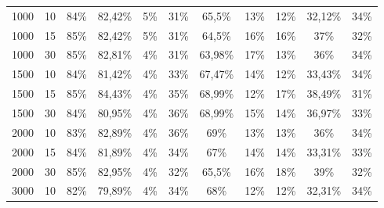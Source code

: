 \begin{table}[ht]
\begin{tabular}{cc|ccc|ccc|ccc}
        {1000}   & {10}     & {84\%}                              & {82,42\%}                           & {5\%}                                    & {31\%}        & {65,5\%}    & {13\%}      & {12\%}        & {32,12\%}   & {34\%}      \\
        {1000}   & {15}     & {85\%}                              & {82,42\%}                           & {5\%}                                    & {31\%}        & {64,5\%}    & {16\%}      & {16\%}        & {37\%}      & {32\%}      \\
        {1000}   & {30}     & {85\%}                              & {82,81\%}                           & {4\%}                                    & {31\%}        & {63,98\%}   & {17\%}      & {13\%}        & {36\%}      & {34\%}      \\
        {1500}   & {10}     & {84\%}                              & {81,42\%}                           & {4\%}                                    & {33\%}        & {67,47\%}   & {14\%}      & {12\%}        & {33,43\%}   & {34\%}      \\
        {1500}   & {15}     & {85\%}                              & {84,43\%}                           & {4\%}                                    & {35\%}        & {68,99\%}   & {12\%}      & {17\%}        & {38,49\%}   & {31\%}      \\
        {1500}   & {30}     & {84\%}                              & {80,95\%}                           & {4\%}                                    & {36\%}        & {68,99\%}   & {15\%}      & {14\%}        & {36,97\%}   & {33\%}      \\
        {2000}   & {10}     & {83\%}                              & {82,89\%}                           & {4\%}                                    & {36\%}        & {69\%}      & {13\%}      & {13\%}        & {36\%}      & {34\%}      \\
        {2000}   & {15}     & {84\%}                              & {81,89\%}                           & {4\%}                                    & {34\%}        & {67\%}      & {14\%}      & {14\%}        & {33,31\%}   & {33\%}      \\
        {2000}   & {30}     & {85\%}                              & {82,95\%}                           & {4\%}                                    & {32\%}        & {65,5\%}    & {16\%}      & {18\%}        & {39\%}      & {32\%}      \\
        {3000}   & {10}     & {82\%}                              & {79,89\%}                           & {4\%}                                    & {34\%}        & {68\%}      & {12\%}      & {12\%}        & {32,31\%}   & {34\%}      \\

\end{tabular}
\end{table}
